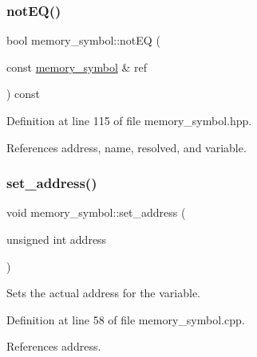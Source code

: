 \mbox{\label{classmemory__symbol_a8d2289e9c5890732a2d9f9147cbad101}} 
\subsubsection{\texorpdfstring{not\+E\+Q()}{notEQ()}}
{\footnotesize\ttfamily bool memory\+\_\+symbol\+::not\+EQ (\begin{DoxyParamCaption}\item[{const \hyperlink{classmemory__symbol}{memory\+\_\+symbol} \&}]{ref }\end{DoxyParamCaption}) const\hspace{0.3cm}{\ttfamily [inline]}}



Definition at line 115 of file memory\+\_\+symbol.\+hpp.



References address, name, resolved, and variable.

\mbox{\label{classmemory__symbol_ab7f217285d6047eaaaa0a2baa1a5ea18}} 
\subsubsection{\texorpdfstring{set\+\_\+address()}{set\_address()}}
{\footnotesize\ttfamily void memory\+\_\+symbol\+::set\+\_\+address (\begin{DoxyParamCaption}\item[{unsigned int}]{address }\end{DoxyParamCaption})}



Sets the actual address for the variable. 



Definition at line 58 of file memory\+\_\+symbol.\+cpp.



References address.

\mbox{\label{classmemory__symbol_a24ab8c8ca79289e4ccd4f9226f0ce17c}} 
